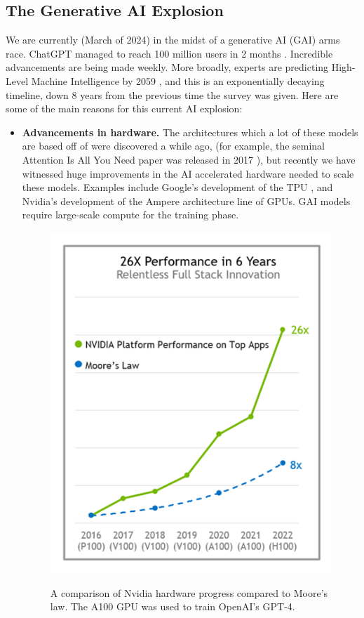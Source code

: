 \documentclass[12pt,a4paper]{article}
\begin{document}
\subsection{The Generative AI Explosion}
We are currently (March of 2024) in the midst of a generative AI (GAI) arms race. ChatGPT managed to reach 100 million users in 2 months \cite{gptstatistics}. Incredible advancements are being made weekly. More broadly, experts are predicting High-Level Machine Intelligence by 2059 \cite{aiimpacts}, and this is an exponentially decaying timeline, down 8 years from the previous time the survey was given. Here are some of the main reasons for this current AI explosion:
\begin{itemize}
    \item \textbf{Advancements in hardware.} The architectures which a lot of these models are based off of were discovered a while ago, (for example, the seminal Attention Is All You Need paper was released in 2017 \cite{attention}), but recently we have witnessed huge improvements in the AI accelerated hardware needed to scale these models. Examples include Google's development of the TPU \cite{tpu}, and Nvidia's development of the Ampere architecture line of GPUs. GAI models require large-scale compute for the training phase. 
    \begin{figure}[H]
        \centering
        \includegraphics[scale=0.6]{nvidiaGraph.png}
        \cite{nvidia}
        \caption{A comparison of Nvidia hardware progress compared to Moore's law. The A100 GPU was used to train OpenAI's GPT-4. \cite{gpt4}}
    \end{figure}


\end{itemize}
\end{document}
